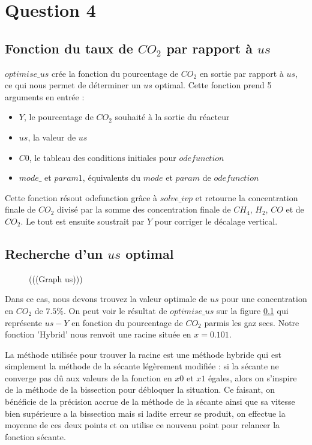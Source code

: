 \documentclass[11pt]{report}
\newcommand{\mychapter}[2]{
    \setcounter{chapter}{#1}
    \setcounter{section}{0}
    \chapter*{#2}
    \addcontentsline{toc}{chapter}{#2}
}
\begin{document}
    \mychapter{4}{Question 4}
        \section{Fonction du taux de $CO_2$ par rapport à $us$}
            $optimise\_us$ crée la fonction du pourcentage de $CO_2$ en sortie par rapport à $us$,
            ce qui nous permet de déterminer un $us$ optimal.
            Cette fonction prend 5 arguments en entrée :
            \begin{itemize}
                \item $Y$, le pourcentage de $CO_2$ souhaité à la sortie du réacteur
                \item $us$, la valeur de $us$
                \item $C0$, le tableau des conditions initiales pour $odefunction$
                \item $mode\_$ et $param1$, équivalents du $mode$ et $param$ de $odefunction$
            \end{itemize}
            Cette fonction résout odefunction grâce à $solve\_ivp$ et retourne la concentration
            finale de $CO_2$ divisé par la somme des concentration finale de $CH_4$, $H_2$,
            $CO$ et de $CO_2$. Le tout est ensuite soustrait par $Y$ pour corriger le décalage vertical.
        \section{Recherche d'un $us$ optimal}
            \begin{figure}[h]
                \centering
                \caption{(((Graph us)))}
                \label{graph:us}
            \end{figure}
            Dans ce cas, nous devons trouvez la valeur optimale de $us$ pour une concentration
            en $CO_2$ de $7.5\%$.
            On peut voir le résultat de $optimise\_us$ sur la figure \ref{graph:us}
            qui représente $us - Y$ en fonction du pourcentage de $CO_2$ parmis les gaz secs.
            Notre fonction 'Hybrid' nous renvoit une racine située en $x = 0.101$.
            \par
            La méthode utilisée pour trouver la racine est une méthode hybride qui est simplement
            la méthode de la sécante légèrement modifiée : si la sécante ne converge pas dû aux
            valeurs de la fonction en $x0$ et $x1$ égales,
            alors on s'inspire de la méthode de la bissection pour  débloquer la situation.
            Ce faisant, on bénéficie de la précision accrue de la méthode de la sécante
            ainsi que sa vitesse bien supérieure a la bissection mais si ladite erreur se produit,
            on effectue la moyenne de ces deux points et on utilise ce nouveau point pour relancer
            la fonction sécante.
\end{document}
